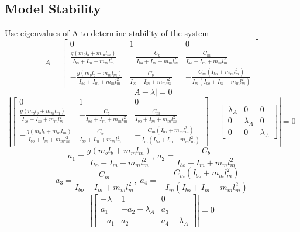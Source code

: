 \documentclass[12pt]{article}
\begin{document}
		\subsection{Model Stability}
			Use eigenvalues of A to determine stability of the system
			\begin{equation}
				A = 
				\begin{bmatrix}
					0 & 1 & 0 \\ 
					\frac{g(m_bl_b+m_ml_m)}{I_{bo}+I_m+m_ml_m^2} & -\frac{C_b}{I_{bo}+I_m+m_ml_m^2} & 	\frac{C_m}{I_{bo}+I_m+m_ml_m^2} \\ 
					-\frac{g(m_bl_b+m_ml_m)}{I_{bo}+I_m+m_ml_m^2} & \frac{C_b}{I_{bo}+I_m+m_ml_m^2} & 	-\frac{C_m(I_{bo}+m_ml_m^2)}{I_m(I_{bo}+I_m+m_ml_m^2)}
				\end{bmatrix}
			\end{equation}
			\begin{equation}
				|A - \lambda| = 0 
			\end{equation}
			\begin{equation}
				\left|
				\begin{bmatrix}
					0 & 1 & 0 \\ 
					\frac{g(m_bl_b+m_ml_m)}{I_{bo}+I_m+m_ml_m^2} & -\frac{C_b}{I_{bo}+I_m+m_ml_m^2} & 	\frac{C_m}{I_{bo}+I_m+m_ml_m^2} \\ 
					-\frac{g(m_bl_b+m_ml_m)}{I_{bo}+I_m+m_ml_m^2} & \frac{C_b}{I_{bo}+I_m+m_ml_m^2} & 	-\frac{C_m(I_{bo}+m_ml_m^2)}{I_m(I_{bo}+I_m+m_ml_m^2)}
				\end{bmatrix}
				-
				\begin{bmatrix}
					\lambda_A & 0 & 0 \\ 0 & \lambda_A & 0 \\ 0 & 0 & \lambda_A
				\end{bmatrix}
				\right|
				= 0
			\end{equation}
			\begin{equation}
				a_1 = \frac{g(m_bl_b+m_ml_m)}{I_{bo}+I_m+m_ml_m^2},\ a_2 = \frac{C_b}{I_{bo}+I_m+m_ml_m^2}
			\end{equation}
			\begin{equation}
				a_3 = \frac{C_m}{I_{bo}+I_m+m_ml_m^2},\ a_4 = -\frac{C_m(I_{bo}+m_ml_m^2)}{I_m(I_{bo}+I_m+m_ml_m^2)}
			\end{equation}
			\begin{equation}
				\left|
				\begin{bmatrix}
					-\lambda & 1 & 0 \\ 
					a_1 & -a_2-\lambda_A & 	a_3 \\ 
					-a_1 & a_2 & a_4-\lambda_A
				\end{bmatrix}
				\right| = 0
			\end{equation}
\end{document}
